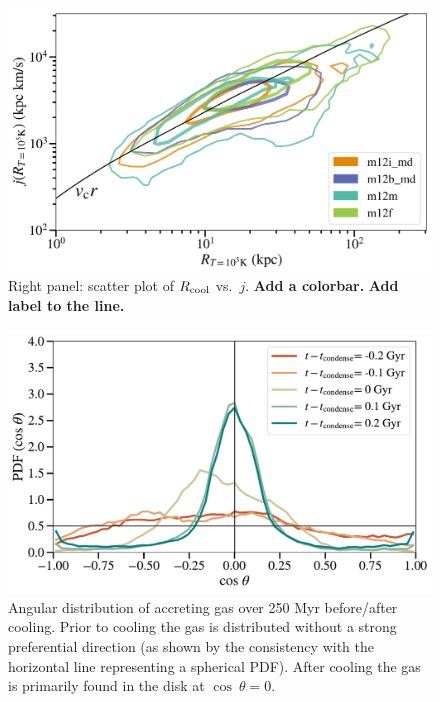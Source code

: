 \documentclass[fleqn,usenatbib]{mnras}
\newcommand{\Rcool}{R_{\rm cool}} %
\begin{document}
\begin{figure}
    \centering
    \includegraphics[width=\columnwidth]{figures/j_vs_rcondense.png}
    \caption{
    Right panel: scatter plot of $\Rcool$ vs.~$j$.
    \textbf{Add a colorbar.}
    \textbf{Add label to the line.}
    }
    \label{f:Rcool}
\end{figure}


\begin{figure}
    \centering
    \includegraphics[width=\columnwidth]{figures/theta_vs_t.pdf}
    \caption{
    Angular distribution of accreting gas over 250 Myr before/after cooling.
    Prior to cooling the gas is distributed without a strong preferential direction (as shown by the consistency with the horizontal line representing a spherical PDF).
    After cooling the gas is primarily found in the disk at $\cos\ \theta = 0$.
    }
    \label{f: theta vs R}
\end{figure}
\end{document}
